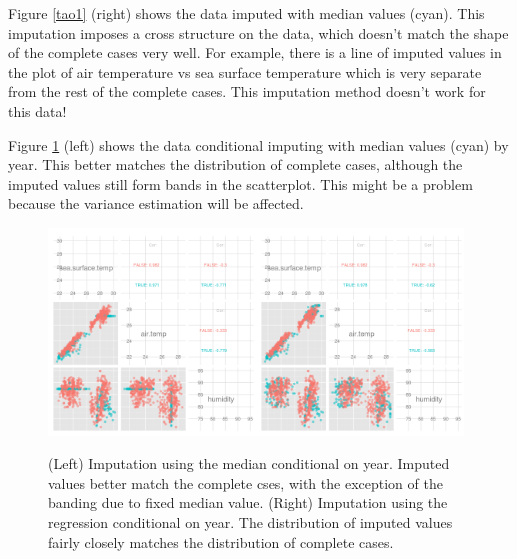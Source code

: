 \documentclass[english]{article}
\begin{document}
Figure \ref{tao1} (right) shows the data imputed with median values (cyan). This imputation imposes a cross structure on the data, which doesn't match the shape of the complete cases very well. For example, there is a line of imputed values in the plot of air temperature vs sea surface temperature which is very separate from the rest of the complete cases. This imputation method doesn't work for this data!


Figure \ref{tao3} (left) shows the data conditional imputing with median values (cyan) by year. This better matches the distribution of complete cases, although the imputed values still form bands in the scatterplot. This might be a problem because the variance estimation will be affected. 


\begin{figure}[htp]
\centerline{\includegraphics[width=0.49\textwidth]{tao3_pairwise.png}\includegraphics[width=0.49\textwidth]{tao5_pairwise.png}}
\caption{(Left) Imputation using the median conditional on year. Imputed values better match the complete cses, with the exception of the banding due to fixed median value. (Right) Imputation using the regression conditional on year. The distribution of imputed values fairly closely matches the distribution of complete cases.}
\label{tao3}
\end{figure}
\end{document}

